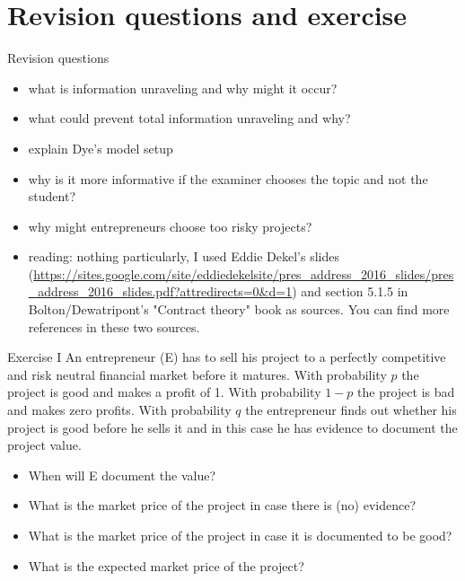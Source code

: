 \documentclass[bigger]{beamer}
\begin{document}
\section{Revision questions and exercise}
\label{sec:orgheadline24}

\begin{frame}[label={sec:orgheadline21}]{Revision questions}
\begin{itemize}
\item what is information unraveling and why might it occur?
\item what could prevent total information unraveling and why?
\item explain Dye's model setup
\item why is it more informative if the examiner chooses the topic and not the student?
\item why might entrepreneurs choose too risky projects?
\end{itemize}

\vspace*{0.5cm}

\begin{itemize}
\item reading: nothing particularly, I used Eddie Dekel's slides (\url{https://sites.google.com/site/eddiedekelsite/pres_address_2016_slides/pres_address_2016_slides.pdf?attredirects=0&d=1}) and section 5.1.5 in Bolton/Dewatripont's "Contract theory" book as sources. You can find more references in these two sources.
\end{itemize}
\end{frame}

\begin{frame}[label={sec:orgheadline22}]{Exercise I}
An entrepreneur (E) has to sell his project to a perfectly competitive and risk neutral financial market before it matures. With probability \(p\) the project is good and makes a profit of 1. With probability \(1-p\) the project is bad and makes zero profits. With probability \(q\) the entrepreneur finds out whether his project is good before he sells it and in this case he has evidence to document the project value.

\begin{itemize}
\item When will E document the value?

\item What is the market price of the project in case there is (no) evidence?

\item What is the market price of the project in case it is documented to be good?

\item What is the expected market price of the project?
\end{itemize}
\end{frame}
\end{document}
